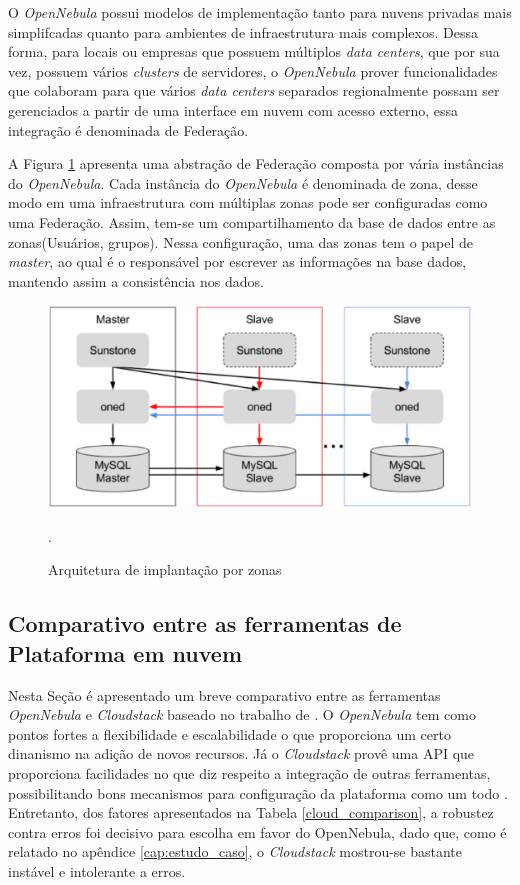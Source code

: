 O \textit{OpenNebula} possui modelos de implementação tanto para nuvens privadas mais simplifcadas quanto para ambientes de infraestrutura mais complexos. Dessa forma, para locais ou empresas que possuem múltiplos \textit{data centers}, que por sua vez, possuem vários \textit{clusters} de servidores, o \textit{OpenNebula} prover funcionalidades que colaboram para que vários \textit{data centers} separados regionalmente possam ser gerenciados a partir de uma interface em nuvem com acesso externo, essa integração é denominada de Federação. 

A Figura \ref{opennebulafederation} apresenta uma abstração de Federação composta por vária instâncias do \textit{OpenNebula}. Cada instância do \textit{OpenNebula} é denominada de zona, desse modo em uma infraestrutura com múltiplas zonas pode ser configuradas como uma Federação. Assim, tem-se um compartilhamento da base de dados entre as zonas(Usuários, grupos). Nessa configuração, uma das zonas tem o papel de \textit{master}, ao qual é o responsável por escrever as informações na base dados, mantendo assim a consistência nos dados\cite{opennebula}.

\begin{figure}[!htb]
\centering
\includegraphics [keepaspectratio=true,scale=0.50]{figuras/opennebula_zone.eps}
\caption{Arquitetura de implantação por zonas}
\cite{opennebula}.
\label{opennebulafederation}
\end{figure}

\subsection{Comparativo entre as ferramentas de Plataforma em nuvem}

Nesta Seção é apresentado um breve comparativo entre as ferramentas \textit{OpenNebula} e \textit{Cloudstack} baseado no trabalho de . O \textit{OpenNebula} tem como pontos fortes a flexibilidade e escalabilidade o que proporciona um certo dinanismo na adição de novos recursos. Já o \textit{Cloudstack} provê uma API que proporciona facilidades no que diz respeito a integração de outras ferramentas, possibilitando bons mecanismos para configuração da plataforma como um todo \cite{salam}. Entretanto, dos fatores apresentados na Tabela \ref{cloud_comparison}, a robustez contra erros foi decisivo para escolha em favor do OpenNebula, dado que, como é relatado no apêndice \ref{cap:estudo_caso}, o \textit{Cloudstack} mostrou-se bastante instável e intolerante a erros.

